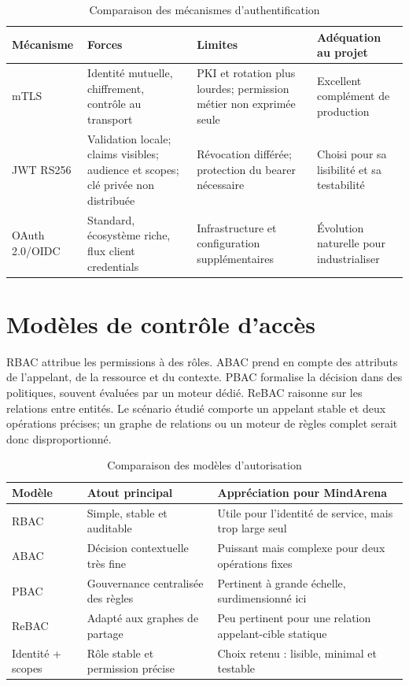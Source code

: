 \documentclass[12pt,a4paper,oneside]{report}
\begin{document}
\begin{table}[H]
\centering
\caption{Comparaison des mécanismes d'authentification}
\label{tab:authn-comparison}
\small
\begin{tabularx}{\textwidth}{P{2.2cm}Y Y Y}
\toprule
\textbf{Mécanisme} & \textbf{Forces} & \textbf{Limites} & \textbf{Adéquation au projet} \\
\midrule
mTLS & Identité mutuelle, chiffrement, contrôle au transport & PKI et rotation plus lourdes; permission métier non exprimée seule & Excellent complément de production \\
JWT RS256 & Validation locale; claims visibles; audience et scopes; clé privée non distribuée & Révocation différée; protection du bearer nécessaire & Choisi pour sa lisibilité et sa testabilité \\
OAuth 2.0/OIDC & Standard, écosystème riche, flux client credentials & Infrastructure et configuration supplémentaires & Évolution naturelle pour industrialiser \\
\bottomrule
\end{tabularx}
\end{table}

\section{Modèles de contrôle d'accès}
RBAC attribue les permissions à des rôles. ABAC prend en compte des attributs de
l'appelant, de la ressource et du contexte. PBAC formalise la décision dans des
politiques, souvent évaluées par un moteur dédié. ReBAC raisonne sur les relations
entre entités. Le scénario étudié comporte un appelant stable et deux opérations
précises; un graphe de relations ou un moteur de règles complet serait donc
disproportionné.

\begin{table}[H]
\centering
\caption{Comparaison des modèles d'autorisation}
\label{tab:authz-comparison}
\small
\begin{tabularx}{\textwidth}{P{1.8cm}Y Y}
\toprule
\textbf{Modèle} & \textbf{Atout principal} & \textbf{Appréciation pour MindArena} \\
\midrule
RBAC & Simple, stable et auditable & Utile pour l'identité de service, mais trop large seul \\
ABAC & Décision contextuelle très fine & Puissant mais complexe pour deux opérations fixes \\
PBAC & Gouvernance centralisée des règles & Pertinent à grande échelle, surdimensionné ici \\
ReBAC & Adapté aux graphes de partage & Peu pertinent pour une relation appelant-cible statique \\
Identité + scopes & Rôle stable et permission précise & Choix retenu : lisible, minimal et testable \\
\bottomrule
\end{tabularx}
\end{table}
\end{document}
